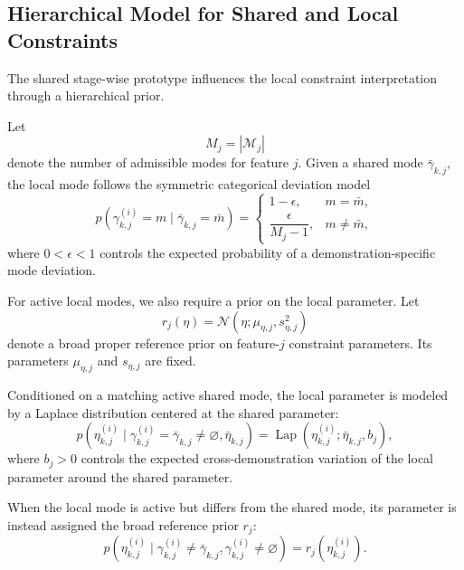 \documentclass[lettersize,journal]{IEEEtran}
\begin{document}
\subsection{Hierarchical Model for Shared and Local Constraints}
\label{subsec:hierarchical_constraint_model}

The shared stage-wise prototype influences the local constraint interpretation
through a hierarchical prior.

Let
\[
M_j
=
|\mathcal{M}_j|
\]
denote the number of admissible modes for feature $j$. Given a shared mode
$\bar{\gamma}_{k,j}$, the local mode follows the symmetric categorical deviation
model
\begin{equation}
p
\left(
\gamma_{k,j}^{(i)}=m
\mid
\bar{\gamma}_{k,j}=\bar{m}
\right)
=
\begin{cases}
1-\epsilon,
& m=\bar{m},
\\[0.3em]
\dfrac{\epsilon}{M_j-1},
& m\neq\bar{m},
\end{cases}
\label{eq:hierarchical_mode_model}
\end{equation}
where $0<\epsilon<1$ controls the expected probability of a
demonstration-specific mode deviation.

For active local modes, we also require a prior on the local parameter.
Let
\begin{equation}
r_j(\eta)
=
\mathcal{N}
\left(
\eta;
\mu_{\eta,j},
s_{\eta,j}^{2}
\right)
\label{eq:broad_parameter_reference_prior}
\end{equation}
denote a broad proper reference prior on feature-$j$ constraint parameters.
Its parameters $\mu_{\eta,j}$ and $s_{\eta,j}$ are fixed.

Conditioned on a matching active shared mode, the local parameter is modeled by
a Laplace distribution centered at the shared parameter:
\begin{equation}
p
\left(
\eta_{k,j}^{(i)}
\mid
\gamma_{k,j}^{(i)}
=
\bar{\gamma}_{k,j}
\neq\varnothing,
\bar{\eta}_{k,j}
\right)
=
\operatorname{Lap}
\left(
\eta_{k,j}^{(i)};
\bar{\eta}_{k,j},
b_j
\right),
\label{eq:hierarchical_parameter_laplace}
\end{equation}
where $b_j>0$ controls the expected cross-demonstration variation of the local
parameter around the shared parameter.

When the local mode is active but differs from the shared mode, its parameter is
instead assigned the broad reference prior $r_j$:
\begin{equation}
p
\left(
\eta_{k,j}^{(i)}
\mid
\gamma_{k,j}^{(i)}\neq\bar{\gamma}_{k,j},
\gamma_{k,j}^{(i)}\neq\varnothing
\right)
=
r_j
\left(
\eta_{k,j}^{(i)}
\right).
\label{eq:mismatched_parameter_prior}
\end{equation}
\end{document}
